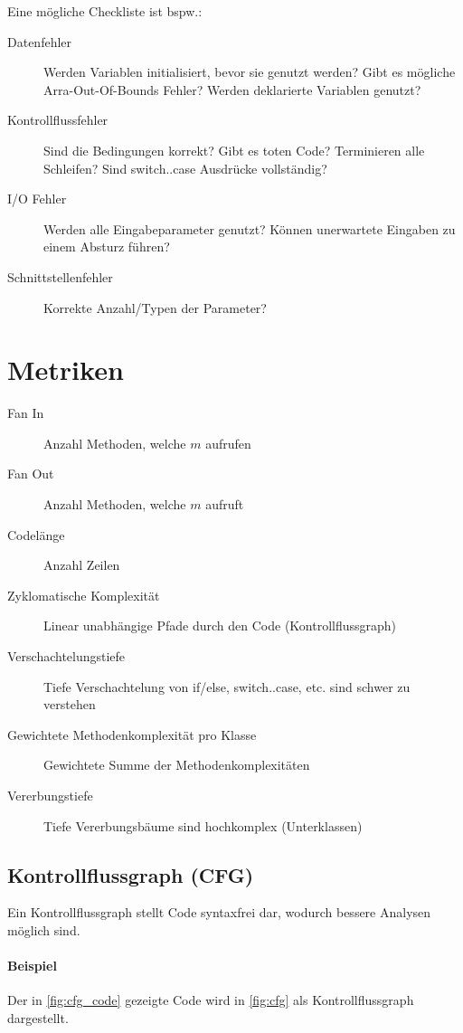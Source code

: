 \documentclass[a4paper, 11pt, accentcolor = tud3b]{tudreport}
\begin{document}
				Eine mögliche Checkliste ist bspw.:
				\begin{description}
					\item[Datenfehler] Werden Variablen initialisiert, bevor sie genutzt werden? Gibt es mögliche Arra-Out-Of-Bounds Fehler? Werden deklarierte Variablen genutzt?
					\item[Kontrollflussfehler] Sind die Bedingungen korrekt? Gibt es toten Code? Terminieren alle Schleifen? Sind switch..case Ausdrücke vollständig?
					\item[I/O Fehler] Werden alle Eingabeparameter genutzt? Können unerwartete Eingaben zu einem Absturz führen?
					\item[Schnittstellenfehler] Korrekte Anzahl/Typen der Parameter?
				\end{description}
		
		\section{Metriken}
			\label{sec:metrics}
			
			\begin{description}
				\item[Fan In] Anzahl Methoden, welche $ m $ aufrufen
				\item[Fan Out] Anzahl Methoden, welche $ m $ aufruft
				\item[Codelänge] Anzahl Zeilen
				\item[Zyklomatische Komplexität] Linear unabhängige Pfade durch den Code (Kontrollflussgraph)
				\item[Verschachtelungstiefe] Tiefe Verschachtelung von if/else, switch..case, etc. sind schwer zu verstehen
				\item[Gewichtete Methodenkomplexität pro Klasse] Gewichtete Summe der Methodenkomplexitäten
				\item[Vererbungstiefe] Tiefe Vererbungsbäume sind hochkomplex (Unterklassen)
			\end{description}
		
			\subsection{Kontrollflussgraph (CFG)}
				\label{diagram:cfg}

				Ein Kontrollflussgraph stellt Code syntaxfrei dar, wodurch bessere Analysen möglich sind.
				
				\paragraph{Beispiel}
					Der in \ref{fig:cfg_code} gezeigte Code wird in \ref{fig:cfg} als Kontrollflussgraph dargestellt.
\end{document}

